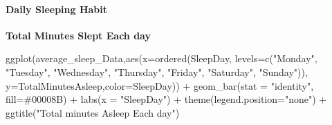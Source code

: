 \documentclass[
]{article}
\newenvironment{Shaded}{\begin{snugshade}}{\end{snugshade}}
\newcommand{\AttributeTok}[1]{\textcolor[rgb]{0.77,0.63,0.00}{#1}}
\newcommand{\FunctionTok}[1]{\textcolor[rgb]{0.00,0.00,0.00}{#1}}
\newcommand{\NormalTok}[1]{#1}
\newcommand{\OtherTok}[1]{\textcolor[rgb]{0.56,0.35,0.01}{#1}}
\newcommand{\SpecialCharTok}[1]{\textcolor[rgb]{0.00,0.00,0.00}{#1}}
\newcommand{\StringTok}[1]{\textcolor[rgb]{0.31,0.60,0.02}{#1}}
\begin{document}
\hypertarget{daily-sleeping-habit}{%
\paragraph{Daily Sleeping Habit}\label{daily-sleeping-habit}}

\begin{Shaded}
\end{Shaded}

\hfill\break
\textbf{Total Minutes Slept Each day}

\begin{Shaded}
\begin{Highlighting}[]
\FunctionTok{ggplot}\NormalTok{(average\_sleep\_Data,}\FunctionTok{aes}\NormalTok{(}\AttributeTok{x=}\FunctionTok{ordered}\NormalTok{(SleepDay, }
                                        \AttributeTok{levels=}\FunctionTok{c}\NormalTok{(}\StringTok{"Monday"}\NormalTok{, }\StringTok{"Tuesday"}\NormalTok{, }\StringTok{"Wednesday"}\NormalTok{, }\StringTok{"Thursday"}\NormalTok{,}
                                                 \StringTok{"Friday"}\NormalTok{, }\StringTok{"Saturday"}\NormalTok{, }\StringTok{"Sunday"}\NormalTok{)), }
                              \AttributeTok{y=}\NormalTok{TotalMinutesAsleep,}\AttributeTok{color=}\NormalTok{SleepDay)) }\SpecialCharTok{+} 
  \FunctionTok{geom\_bar}\NormalTok{(}\AttributeTok{stat =} \StringTok{"identity"}\NormalTok{, }\AttributeTok{fill=}\StringTok{\textquotesingle{}\#00008B\textquotesingle{}}\NormalTok{) }\SpecialCharTok{+} \FunctionTok{labs}\NormalTok{(}\AttributeTok{x =} \StringTok{"SleepDay"}\NormalTok{) }\SpecialCharTok{+}
  \FunctionTok{theme}\NormalTok{(}\AttributeTok{legend.position=}\StringTok{"none"}\NormalTok{) }\SpecialCharTok{+}
  \FunctionTok{ggtitle}\NormalTok{(}\StringTok{"Total minutes Asleep Each day"}\NormalTok{)}
\end{Highlighting}
\end{Shaded}
\end{document}
